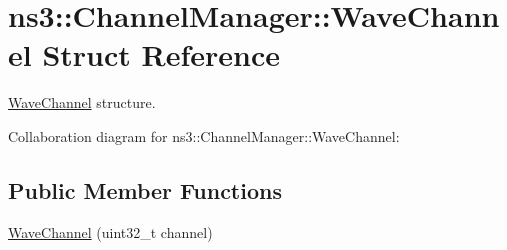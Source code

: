 \hypertarget{structns3_1_1ChannelManager_1_1WaveChannel}{}\section{ns3\+:\+:Channel\+Manager\+:\+:Wave\+Channel Struct Reference}
\label{structns3_1_1ChannelManager_1_1WaveChannel}


\hyperlink{structns3_1_1ChannelManager_1_1WaveChannel}{Wave\+Channel} structure.  




Collaboration diagram for ns3\+:\+:Channel\+Manager\+:\+:Wave\+Channel\+:
\subsection*{Public Member Functions}
\begin{DoxyCompactItemize}
\item 
\hyperlink{structns3_1_1ChannelManager_1_1WaveChannel_ac9521f8de7650e14a5e7adbcc1a09ce3}{Wave\+Channel} (uint32\+\_\+t channel)
\end{DoxyCompactItemize}
